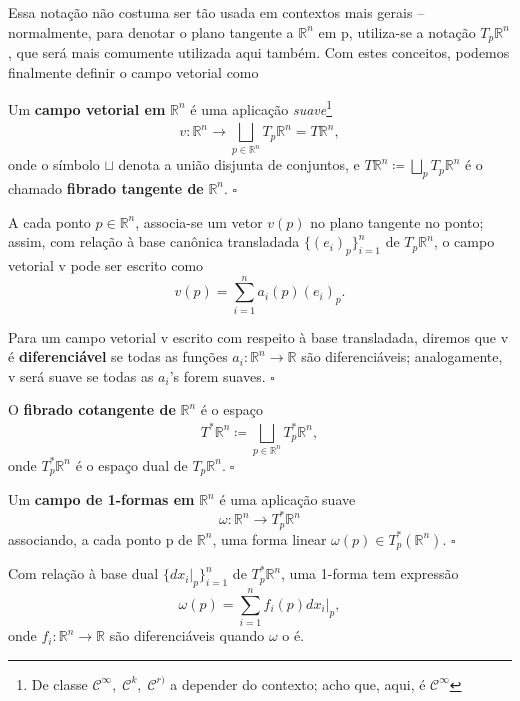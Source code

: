\documentclass[../differential_forms.tex]{subfiles}
\begin{document}
Essa notação não costuma ser tão usada em contextos mais gerais -- normalmente, para denotar o plano tangente a \(\mathbb{R}^{n}\) em p, utiliza-se a notação \(T_{p}\mathbb{R}^{n}\), que será mais comumente
utilizada aqui também. Com estes conceitos, podemos finalmente definir o campo vetorial como
\begin{def*}
	Um \textbf{campo vetorial em }\(\mathbb{R}^{n}\) é uma aplicação \textit{suave}\footnote{De classe \(\mathcal{C}^{\infty},\; \mathcal{C}^{k},\; \mathcal{C}^{r)}\) a depender do contexto; acho que, aqui, é \(\mathcal{C}^{\infty}\)}
	\[
		v:\mathbb{R}^{n}\rightarrow \bigsqcup_{p\in \mathbb{R}^{n}}^{}T_p\mathbb{R}^{n}=T\mathbb{R}^{n},
	\]
	onde o símbolo \(\sqcup\) denota a união disjunta de conjuntos, e \(T\mathbb{R}^{n}\coloneqq \bigsqcup_{p}^{}T_{p}\mathbb{R}^{n}\) é o chamado \textbf{fibrado tangente de }\(\mathbb{R}^{n}\). \(\square\)
\end{def*}
A cada ponto \(p\in \mathbb{R}^{n}\), associa-se um vetor \(v(p)\) no plano tangente no ponto; assim, com relação à base canônica transladada \(\{(e_{i})_p\}_{i=1}^{n}\) de \(T_p\mathbb{R}^{n}\), o campo vetorial v pode ser escrito como
\[
	v(p) = \sum\limits_{i=1}^{n}a_{i}(p)(e_{i})_p.
\]
\begin{def*}
	Para um campo vetorial v escrito com respeito à base transladada, diremos que v é \textbf{diferenciável} se todas as funções \(a_{i}:\mathbb{R}^{n}\rightarrow \mathbb{R}\) são diferenciáveis; analogamente, v será suave se todas as \(a_{i}\)'s forem suaves. \(\square\)
\end{def*}
\begin{def*}
	O \textbf{fibrado cotangente de }\(\mathbb{R}^{n}\) é o espaço
	\[
		T^{*}\mathbb{R}^{n}\coloneqq \bigsqcup_{p\in \mathbb{R}^{n}}^{}T_{p}^{*}\mathbb{R}^{n},
	\]
	onde \(T_{p}^{*}\mathbb{R}^{n}\) é o espaço dual de \(T_{p}\mathbb{R}^{n}.\; \square\)
\end{def*}
\begin{def*}
	Um \textbf{campo de 1-formas em }\(\mathbb{R}^{n}\) é uma aplicação suave
	\[
		\omega :\mathbb{R}^{n}\rightarrow T_{p}^{*}\mathbb{R}^{n}
	\]
	associando, a cada ponto p de \(\mathbb{R}^{n}\), uma forma linear \(\omega (p)\in T_{p}^{*}(\mathbb{R}^{n})\). \(\square\)
\end{def*}
Com relação à base dual \(\{dx_{i}|_{p}\}_{i=1}^{n}\) de \(T_{p}^{*}\mathbb{R}^{n}\), uma 1-forma tem expressão
\[
	\omega (p)=\sum\limits_{i=1}^{n}f_{i}(p)dx_{i}|_{p},
\]
onde \(f_{i}:\mathbb{R}^{n}\rightarrow \mathbb{R}\) são diferenciáveis quando \(\omega \) o é.
\end{document}
